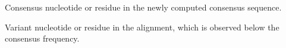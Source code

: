 \documentclass{report}
\begin{document}
\begin{table}[h]

		\centering
		\begin{ThreePartTable}
			
			\caption{Variant amino acid substitutions in Asibi and Hamster/P7 Strains.}
			
			\label{my-label}
			
			\begin{tablenotes}
				\item[a] Consensus nucleotide or residue in the newly computed consensus sequence.
				\item[b] Variant nucleotide or residue in the alignment, which is observed below the consensus frequency.
			\end{tablenotes}
		\end{ThreePartTable}
\end{table}
\end{document}
